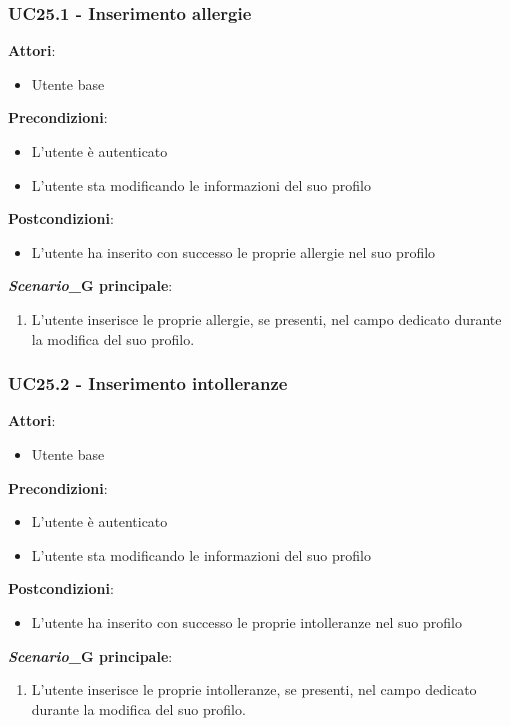 \subsubsection{UC25.1 - Inserimento allergie}\label{usecase:25_1}
\textbf{Attori}:
\begin{itemize}
    \item Utente base
\end{itemize}
\textbf{Precondizioni}:
\begin{itemize}
    \item L'utente è autenticato
    \item L'utente sta modificando le informazioni del suo profilo
\end{itemize}
\textbf{Postcondizioni}:
\begin{itemize}
    \item L'utente ha inserito con successo le proprie allergie nel suo profilo
\end{itemize}
\textbf{\textit{Scenario}_G principale}:
\begin{enumerate}
    \item L'utente inserisce le proprie allergie, se presenti, nel campo dedicato durante la modifica del suo profilo.
\end{enumerate}

\subsubsection{UC25.2 - Inserimento intolleranze}\label{usecase:25_2}
\textbf{Attori}:
\begin{itemize}
    \item Utente base
\end{itemize}
\textbf{Precondizioni}:
\begin{itemize}
    \item L'utente è autenticato
    \item L'utente sta modificando le informazioni del suo profilo
\end{itemize}
\textbf{Postcondizioni}:
\begin{itemize}
    \item L'utente ha inserito con successo le proprie intolleranze nel suo profilo
\end{itemize}
\textbf{\textit{Scenario}_G principale}:
\begin{enumerate}
    \item L'utente inserisce le proprie intolleranze, se presenti, nel campo dedicato durante la modifica del suo profilo.
\end{enumerate}

 

\newpage

